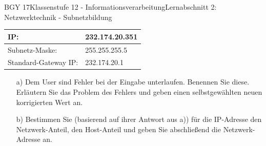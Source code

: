 \documentclass[oneside,openany,headings=optiontotoc,11pt,numbers=noenddot]{scrreprt}
\begin{document}
\begin{worksheet}{BGY 17}{Klassenstufe 12 - Informationsverarbeitung}{Lernabschnitt 2: Netzwerktechnik - Subnetzbildung}
\begin{framed}
			\par
			\begin{tabular}{l|l}
				\hline
				IP: & 232.174.20.351\\
				\hline
				Subnetz-Maske: & 255.255.255.5\\
				\hline
				Standard-Gateway IP: & 232.174.20.1\\
				\hline
			\end{tabular}
			\begin{itemize}
				\item[a)] Dem User sind Fehler bei der Eingabe unterlaufen. Benennen Sie diese.\\
				Erläutern Sie das Problem des Fehlers und geben einen selbstgewählten neuen korrigierten Wert an.
				\item[b)] Bestimmen Sie (basierend auf ihrer Antwort aus a)) für die IP-Adresse den Netzwerk-Anteil, den Host-Anteil und geben Sie abschließend die Netzwerk-Adresse an.
			\end{itemize}
		\end{framed}
	\end{worksheet}
\end{document}
